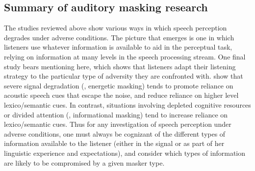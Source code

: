 \subsection{Summary of auditory masking research}
The studies reviewed above show various ways in which speech perception degrades under adverse conditions.  The picture that emerges is one in which listeners use whatever information is available to aid in the perceptual task, relying on information at many levels in the speech processing stream.  One final study bears mentioning here, which shows that listeners adapt their listening strategy to the particular type of adversity they are confronted with.  \citet{MattysEtAl2009} show that severe signal degradation (\ie, energetic masking) tends to promote reliance on acoustic speech cues that escape the noise, and reduce reliance on higher level lexico\-/semantic cues.  In contrast, situations involving depleted cognitive resources or divided attention (\ie, informational masking) tend to increase reliance on lexico\-/semantic cues.  Thus for any investigation of speech perception under adverse conditions, one must always be cognizant of the different types of information available to the listener (either in the signal or as part of her linguistic experience and expectations), and consider which types of information are likely to be compromised by a given masker type. 

